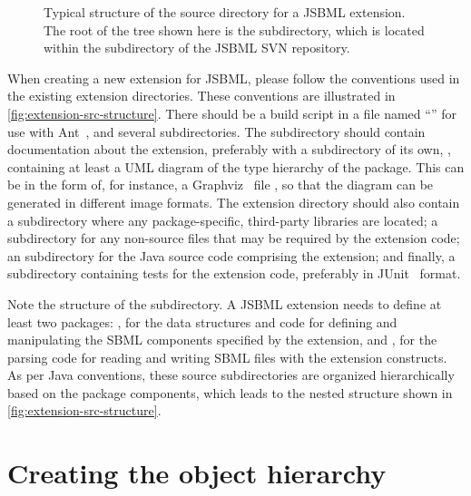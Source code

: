 \begin{wrapfigure}[23]{r}{2.05in}
  \vspace*{-3ex}
  \caption{Typical structure of the source directory for a JSBML extension.
    The root of the tree shown here is the  subdirectory,
    which is located within the  subdirectory of the JSBML SVN
    repository.}
  \label{fig:extension-src-structure}
\end{wrapfigure}
When creating a new extension for JSBML, please follow the conventions used
in the existing extension directories.  These conventions are illustrated in
\vref{fig:extension-src-structure}.  There should be a build script in a file
named ``'' for use with Ant~\citep{ApacheAnt}, and several
subdirectories.  The  subdirectory should contain documentation
about the extension, preferably with a subdirectory of its own, ,
containing at least a UML diagram of the type hierarchy of the package.  This
can be in the form of, for instance, a Graphviz~\cite{graphvizWebsite} file
, so that the diagram can be generated in different
image formats.  The extension directory should also contain a 
subdirectory where any package-specific, third-party libraries are located; a
 subdirectory for any non-source files that may be required
by the extension code; an  subdirectory for the Java source code
comprising the extension; and finally, a  subdirectory containing
tests for the extension code, preferably in JUnit~\cite{junitWebsite}
format.

Note the structure of the  subdirectory. A JSBML extension needs
to define at least two packages: , for the
data structures and code for defining and manipulating the SBML components
specified by the extension, and , for the
parsing code for reading and writing SBML files with the extension
constructs.  As per Java conventions, these source subdirectories are
organized hierarchically based on the package components, which leads to
the nested structure shown in \vref{fig:extension-src-structure}.


\section{Creating the object hierarchy}
\label{sec:creating-obj-hierarchy}

